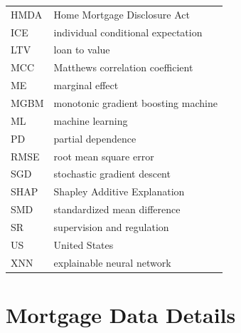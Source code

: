\documentclass[information,article,accept,moreauthors,pdftex]{Definitions/mdpi}
\begin{document}
{{\noindent 
\begin{tabular}{@{}ll}
HMDA & Home Mortgage Disclosure Act\\%
ICE & individual conditional expectation\\%
LTV & loan to value\\ %
MCC & Matthews correlation coefficient\\%
ME & marginal effect\\ %
MGBM & monotonic gradient boosting machine\\
ML & machine learning\\ %
PD & partial dependence\\ %
RMSE & root mean square error\\ %
SGD & stochastic gradient descent\\%
SHAP & Shapley Additive Explanation\\ %
SMD & standardized mean difference\\ %
SR & supervision and regulation\\ %
US & United States\\ 
XNN & explainable neural network 
\end{tabular}}

\vspace{6pt} 

\appendix

\section{Mortgage Data Details}\label{a_sec:mort}

}
\end{document}
